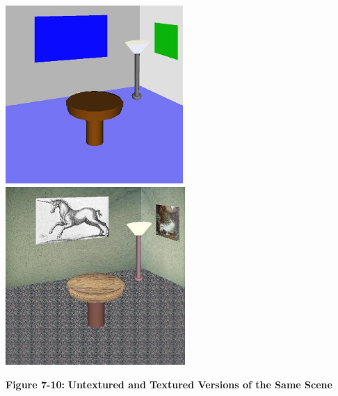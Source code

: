 {\color{green}
 \includegraphics[width=2.6543in,height=2.6693in]{ub-img/ub-img41.jpg}
\textbf{ \ \ \ \ \ \ \ \ \ \ \ \ \ }
\includegraphics[width=2.6846in,height=2.6693in]{ub-img/ub-img42.jpg} }

{\sffamily\bfseries Figure 7-10:}
{\sffamily\bfseries Untextured and Textured Versions of the Same Scene}

\bigskip

